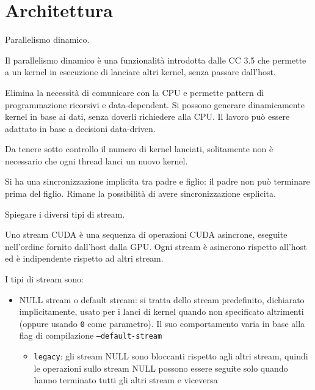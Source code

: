 \section{Architettura}

\begin{questions}
    \question Parallelismo dinamico.
    
    \begin{solution}
        Il parallelismo dinamico è una funzionalità introdotta dalle CC 3.5 che permette a un kernel in esecuzione di lanciare altri kernel, senza passare dall'host. 
        
        Elimina la necessità di comunicare con la CPU e permette pattern di programmazione ricorsivi e data-dependent. Si possono generare dinamicamente kernel in base ai dati, senza doverli richiedere alla CPU. Il lavoro può essere adattato in base a decisioni data-driven.
        
        Da tenere sotto controllo il numero di kernel lanciati, solitamente non è necessario che ogni thread lanci un nuovo kernel.
        
        Si ha una sincronizzazione implicita tra padre e figlio: il padre non può terminare prima del figlio. Rimane la possibilità di avere sincronizzazione esplicita.
    \end{solution}
    
    \question Spiegare i diversi tipi di stream.
    
    \begin{solution}
        Uno stream CUDA è una sequenza di operazioni CUDA asincrone, eseguite nell'ordine fornito dall'host dalla GPU. Ogni stream è asincrono rispetto all'host ed è indipendente rispetto ad altri stream.
        
        I tipi di stream sono: 
        \begin{itemize}
            \item NULL stream o default stream: si tratta dello stream predefinito, dichiarato implicitamente, usato per i lanci di kernel quando non specificato altrimenti (oppure usando \texttt{0} come parametro). Il suo comportamento varia in base alla flag di compilazione \texttt{--default-stream}
            \begin{itemize}
                \item \texttt{legacy}: gli stream NULL sono bloccanti rispetto agli altri stream, quindi le operazioni sullo stream NULL possono essere seguite solo quando hanno terminato tutti gli altri stream e viceversa 
                

\end{itemize}
\end{itemize}
\end{solution}
\end{questions}
